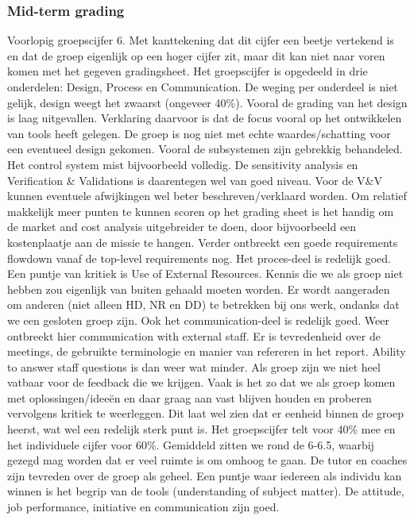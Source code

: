 \subsubsection{Mid-term grading}
Voorlopig groepscijfer 6. Met kanttekening dat dit cijfer een beetje vertekend is en dat de groep eigenlijk op een hoger cijfer zit, maar dit kan niet naar voren komen met het gegeven gradingsheet. Het groepscijfer is opgedeeld in drie onderdelen: Design, Process en Communication. De weging per onderdeel is niet gelijk, design weegt het zwaarst (ongeveer 40\%).
\newline\newline
Vooral de grading van het design is laag uitgevallen. Verklaring daarvoor is dat de focus vooral op het ontwikkelen van tools heeft gelegen. De groep is nog niet met echte waardes/schatting voor een eventueel design gekomen. Vooral de subsystemen zijn gebrekkig behandeled. Het control system mist bijvoorbeeld volledig. De sensitivity analysis en Verification \& Validations is daarentegen wel van goed niveau. Voor de V\&V kunnen eventuele afwijkingen wel beter beschreven/verklaard worden. Om relatief makkelijk meer punten te kunnen scoren op het grading sheet is het handig om de market and cost analysis uitgebreider te doen, door bijvoorbeeld een kostenplaatje aan de missie te hangen. Verder ontbreekt een goede requirements flowdown vanaf de top-level requirements nog.
\newline\newline
Het proces-deel is redelijk goed. Een puntje van kritiek is Use of External Resources. Kennis die we als groep niet hebben zou eigenlijk van buiten gehaald moeten worden. Er wordt aangeraden om anderen (niet alleen HD, NR en DD) te betrekken bij ons werk, ondanks dat we een gesloten groep zijn.
\newline\newline
Ook het communication-deel is redelijk goed. Weer ontbreekt hier communication with external staff. Er is tevredenheid over de meetings, de gebruikte terminologie en manier van refereren in het report. Ability to answer staff questions is dan weer wat minder. Als groep zijn we niet heel vatbaar voor de feedback die we krijgen. Vaak is het zo dat we als groep komen met oplossingen/idee\"{e}n en daar graag aan vast blijven houden en proberen vervolgens kritiek te weerleggen. Dit laat wel zien dat er eenheid binnen de groep heerst, wat wel een redelijk sterk punt is.
\newline\newline
Het groepscijfer telt voor 40\% mee en het individuele cijfer voor 60\%. Gemiddeld zitten we rond de 6-6.5, waarbij gezegd mag worden dat er veel ruimte is om omhoog te gaan. De tutor en coaches zijn tevreden over de groep als geheel. Een puntje waar iedereen als individu kan winnen is het begrip van de tools (understanding of subject matter). De attitude, job performance, initiative en communication zijn goed.
